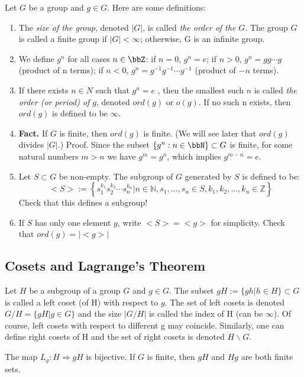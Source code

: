Let $G$ be a group and $g\in G$. Here are some definitions:
\begin{definition}
\begin{enumerate}
    \item The \emph{size of the group}, denoted \emph{$|G|$}, is called \emph{the order of the $G$}. The group $G$ is called a finite group if $|G| < \infty$; otherwise, G is an infinite group.
    \item We define $g^n$ for all cases $n\in \bbZ$: if $n=0$, $g^n =e$; if $n>0$, $g^n =gg\cdots g$ (product of n terms); if $n<0$, $g^n = g^{-1}g^{-1}\cdots g^{-1}$ (product of $-n$ terms).
    \item If there exists $n \in N$ such that $g^n = e$ , then the smallest such $n$ is called \emph{the order (or period) of $g$}, denoted \emph{$ord(g)$} or \emph{$o(g)$}. If no such n exists, then $ord(g)$ is defined to be $\infty$.
    \item \textbf{Fact.} If $G$ is finite, then $ord(g)$ is finite. (We will see later that $ord(g)$ divides $|G|$.) Proof. Since the subset $\{ g^n : n \in \bbN \} \subset G$ is finite, for some natural numbers $m>n$ we have $g^m=g^n$, which implies $g^{m-n}=e$.
    \item Let $S \subset G$ be non-empty. The subgroup of $G$ generated by $S$ is defined to be: $$
    <S>:=\left\{s_{1}^{k_{1}} s_{2}^{k_{2}} \cdots s_{n}^{k_{n}} | n \in \mathbb{N}, s_{1}, \ldots, s_{n} \in S, k_{1}, k_{2}, \ldots, k_{n} \in \mathbb{Z}\right\}
    $$ Check that this defines a subgroup!
    \item If $S$ has only one element $g$, write $<S>=<g>$ for simplicity. Check that $ord(g)=|<g>|$
\end{enumerate}
\end{definition} 

\subsection{Cosets and Lagrange's Theorem}
Let $H$ be a subgroup of a group $G$ and $g \in G$. The subset $gH := \{gh|h\in H\}\subset G$ is called a left coset (of H) with respect to $g$. The set of left cosets is denoted $G/H=\{gH|g\in G\}$ and the size $|G/H|$ is called the index of H (can be $\infty$). Of course, left cosets with respect to different g may coincide. Similarly, one can define right cosets of H and the set of right cosets is denoted $H\backslash G$.

The map $L_g: H\Rightarrow gH$ is bijective. If $G$ is finite, then $gH$ and $Hg$ are both finite sets. 

